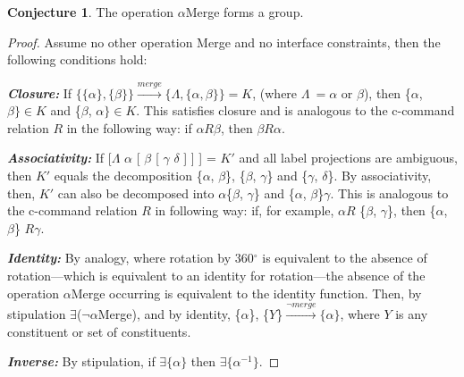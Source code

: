 \documentclass[11pt,twoside]{article}
\theoremstyle{plain}
\numberwithin{equation}{section}
\theoremstyle{definition}
\newtheorem{phrase string}{Phrase String}
\begin{document}
\newtheorem{gmerge}{Conjecture}
\begin{gmerge}
The operation $\alpha$Merge forms a group.
\end{gmerge}


\begin{proof}
Assume no other operation Merge and no interface constraints, then the following conditions hold:

\textsl{\textbf{Closure:}} If $\{\{\alpha\}, \{\beta\}\} \stackrel{merge}{\longrightarrow} \{\Lambda, \{\alpha, \beta\}\} = K$, (where $\Lambda\ = \alpha$ or $\beta$), then \{$\alpha$, $\beta\} \in K$ and \{$\beta$, $\alpha\} \in K$. This satisfies closure and is analogous to the c-command relation $R$ in the following way: if $\alpha R \beta$, then $\beta R \alpha$.

\textsl{\textbf{Associativity:}} If [$\Lambda$ $\alpha$ [ $\beta$ [ $\gamma$ $\delta$ ] ] ] = $K'$ and all label projections are ambiguous, then $K'$ equals the decomposition \{$\alpha$, $\beta$\}, \{$\beta$, $\gamma$\} and \{$\gamma$, $\delta$\}. By associativity, then, $K'$ can also be decomposed into $\alpha$\{$\beta$, $\gamma$\} and  \{$\alpha$, $\beta$\}$\gamma$. This is analogous to the c-command relation $R$ in following way: if, for example,  $\alpha R$ \{$\beta$, $\gamma$\}, then  \{$\alpha$, $\beta$\} $R \gamma$. 

\textsl{\textbf{Identity:}} By analogy, where rotation by 360$^\circ$ is equivalent to the absence of rotation---which is equivalent to an identity for rotation---the absence of the operation $\alpha$Merge occurring is equivalent to the identity function. Then, by stipulation $\exists$($\neg\alpha$Merge), and by identity, \{$\alpha$\}, \{$Y$\}$\stackrel{\neg merge}{\longrightarrow} \{\alpha\}$, where $Y$ is any constituent or set of constituents.

\textsl{\textbf{Inverse:}} By stipulation, if $\exists \{\alpha\}$ then $\exists \{\alpha^{-1}\}$. 

\end{proof}
\end{document}
